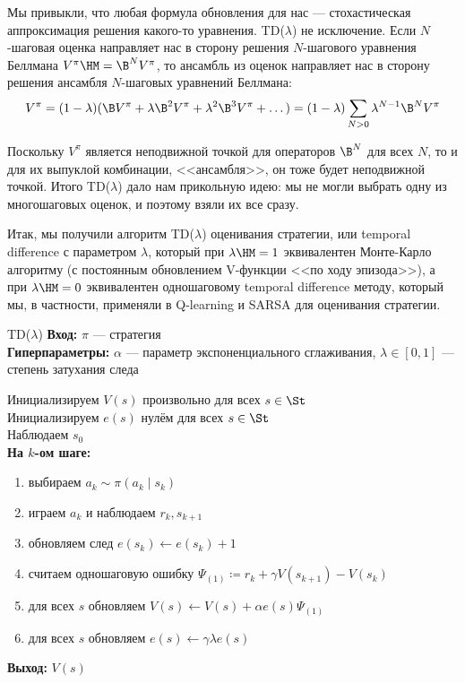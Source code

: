 Мы привыкли, что любая формула обновления для нас --- стохастическая аппроксимация решения какого-то уравнения. TD($\lambda$) не исключение. Если $N$-шаговая оценка направляет нас в сторону решения $N$-шагового уравнения Беллмана $V^{\pi} \HM= \B^N V^{\pi}$, то ансамбль из оценок направляет нас в сторону решения ансамбля $N$-шаговых уравнений Беллмана:
\begin{equation}\label{bellman_ensemble}
V^{\pi} = (1 - \lambda)(\B V^{\pi} + \lambda \B^2 V^{\pi} + \lambda^2 \B^3 V^{\pi} + \dots ) = (1 - \lambda) \sum_{N > 0} \lambda^{N-1} \B^N V^{\pi}
\end{equation}

Поскольку $V^{\pi}$ является неподвижной точкой для операторов $\B^N$ для всех $N$, то и для их выпуклой комбинации, <<ансамбля>>, он тоже будет неподвижной точкой. Итого TD($\lambda$) дало нам прикольную идею: мы не могли выбрать одну из многошаговых оценок, и поэтому взяли их все сразу.

Итак, мы получили алгоритм TD($\lambda$) оценивания стратегии, или temporal difference с параметром $\lambda$, который при $\lambda \HM= 1$ эквивалентен Монте-Карло алгоритму (с постоянным обновлением V-функции <<по ходу эпизода>>), а при $\lambda \HM = 0$ эквивалентен одношаговому temporal difference методу, который мы, в частности, применяли в Q-learning и SARSA для оценивания стратегии.

\begin{algorithm}[label=alg:tdlambda]{TD($\lambda$)}
\textbf{Вход:} $\pi$ --- стратегия \\
\textbf{Гиперпараметры:} $\alpha$ --- параметр экспоненциального сглаживания, $\lambda \in [0, 1]$ --- степень затухания следа

\vspace{0.3cm}
Инициализируем $V(s)$ произвольно для всех $s \in \St$ \\
Инициализируем $e(s)$ нулём для всех $s \in \St$ \\
Наблюдаем $s_0$ \\
\textbf{На $k$-ом шаге:}
\begin{enumerate}
    \item выбираем $a_{k} \sim \pi(a_{k} \mid s_{k})$
    \item играем $a_k$ и наблюдаем $r_k, s_{k+1}$
    \item обновляем след $e(s_k) \leftarrow e(s_k) + 1$
    \item считаем одношаговую ошибку $\Psi_{(1)} \coloneqq r_k + \gamma V(s_{k+1}) - V(s_k)$
    \item для всех $s$ обновляем $V(s) \leftarrow V(s) + \alpha e(s) \Psi_{(1)}$
    \item для всех $s$ обновляем $e(s) \leftarrow \gamma \lambda e(s)$
\end{enumerate}

\vspace{0.3cm}
\textbf{Выход:} $V(s)$
\end{algorithm}

